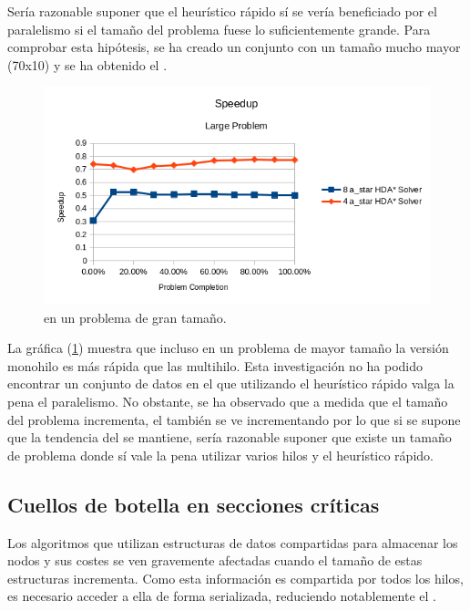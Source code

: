Sería razonable suponer que el heurístico rápido
sí se vería beneficiado por el paralelismo si el tamaño del
problema fuese lo suficientemente grande.
Para comprobar esta hipótesis, se ha creado un conjunto
con un tamaño mucho mayor (70x10) y se ha obtenido el .

\begin{figure}[h]
    \centering
    \includegraphics[width=\textwidth]{Media/Ch2/Speedup_Large_Problem.png}
    \caption{ en un problema de gran tamaño.}
    \label{fig:Speedup_Large_Problem}
\end{figure}

La gráfica (\ref{fig:Speedup_Large_Problem}) muestra que incluso en un problema de mayor tamaño
la versión monohilo es más rápida que las multihilo.
Esta investigación no ha podido encontrar un conjunto de datos
en el que utilizando el heurístico rápido valga la pena el paralelismo.
No obstante, se ha observado que a medida que el tamaño
del problema incrementa, el  también se ve incrementando
por lo que si se supone que la tendencia del 
se mantiene, sería razonable suponer que existe un tamaño de
problema donde sí vale la pena utilizar varios hilos y 
el heurístico rápido.

\subsection{Cuellos de botella en secciones críticas}

Los algoritmos que utilizan estructuras de datos compartidas
para almacenar los nodos y sus costes se ven gravemente
afectadas cuando el tamaño de estas estructuras incrementa.
Como esta información es compartida por todos los hilos,
es necesario acceder a ella de forma serializada,
reduciendo notablemente el .

